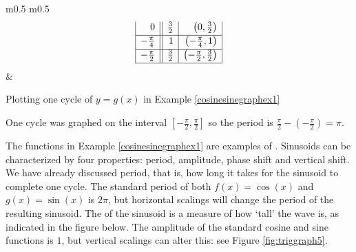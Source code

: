 {\begin{enumerate}
\begin{minipage}{\textwidth}
\begin{center}
\begin{tabular}{m{} m{}}
\[\begin{array}{|r||r|r|}
0 & \frac{3}{2} & \left(0, \frac{3}{2} \right)  \\ [2pt] \hline 

-\frac{\pi}{4}  & 1 &  \left(-\frac{\pi}{4}, 1 \right) \\ [2pt] \hline 

-\frac{\pi}{2} & \frac{3}{2} & \left(-\frac{\pi}{2}, \frac{3}{2} \right) \\  [2pt] \hline
\end{array} \]
\setlength{\extrarowheight}{0pt} & 
\end{tabular}
\end{center}
\captionsetup{type=figure}
\caption{Plotting one cycle of $y=g(x)$ in Example \ref{cosinesinegraphex1}}
\end{minipage}


\medskip

One cycle was graphed on the interval $\left[ -\frac{\pi}{2}, \frac{\pi}{2}\right]$ so the period is $\frac{\pi}{2} - \left(-\frac{\pi}{2}\right) = \pi$. 

\end{enumerate}
}

\medskip

The functions in Example \ref{cosinesinegraphex1} are examples of .  Sinusoids can be characterized by four properties:  period, amplitude, phase shift and vertical shift. We have already discussed period, that is, how long it takes for the sinusoid to complete one cycle.  The standard period of both $f(x) = \cos(x)$ and $g(x) = \sin(x)$ is $2\pi$, but horizontal scalings will change the period of the resulting sinusoid.  The  of the sinusoid is a measure of how `tall' the wave is, as indicated in the figure below.  The amplitude of the standard cosine and sine functions is $1$, but vertical scalings can alter this: see Figure \ref{fig:triggraph5}.  

